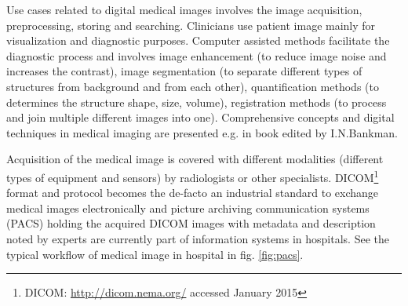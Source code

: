 



Use cases related to digital medical images involves the image acquisition, preprocessing, storing and searching.
Clinicians use patient image mainly for visualization and diagnostic purposes. Computer assisted methods facilitate the diagnostic process and involves image enhancement (to reduce image noise and increases the contrast), image segmentation (to separate different types of structures from background and from each other), quantification methods (to determines the structure shape, size, volume), registration methods (to process and join multiple different images into one).
Comprehensive concepts and digital techniques in medical imaging are presented e.g. in book edited by I.N.Bankman\cite{Bankman2000}.

Acquisition of the medical image is covered with different modalities (different types of equipment and sensors) by radiologists or other specialists. DICOM\footnote{DICOM: \url{http://dicom.nema.org/} accessed January 2015} format and protocol becomes the de-facto an industrial standard to exchange medical images electronically and picture archiving communication systems (PACS) holding the acquired DICOM images with metadata and description noted by experts are currently part of information systems in hospitals. See the typical workflow of medical image in hospital in fig. \ref{fig:pacs}.

